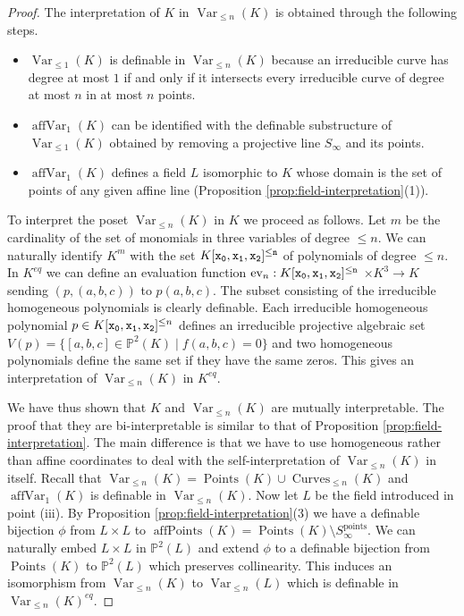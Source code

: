 \documentclass{amsart}
\theoremstyle{plain}
\theoremstyle{definition}
\newcommand{\ev}{\textnormal{ev}}
\newcommand{\nVar}[2]{\operatorname{Var}_{#2} (#1)}
\newcommand{\Points}[1]{\operatorname{Points} (#1)}
\newcommand{\nCurves}[2]{\operatorname{Curves}_{#2}(#1)}
\newcommand{\affPoints}[1]{\operatorname{affPoints} (#1)}
\newcommand{\naffVar}[2]{\operatorname{affVar}_{#2}(#1)}
\begin{document}
\begin{proof}
The interpretation of $K$ in  $\nVar K {\leq n}$ is obtained through the following steps. 
\begin{itemize}
\item[(i)] $\nVar K {\leq 1}$  is definable in $\nVar{K}{\leq n}$ because an irreducible curve has degree at most $1$ if and only if it intersects every irreducible curve of degree at most $n$ in at most $n$ points. 
\item[(ii)] $\naffVar K 1$ can be identified with the definable substructure of $\nVar K {\leq 1}$ obtained by removing a projective line $S_\infty$ and its points. 
\item[(iii)] $\naffVar K 1$ defines a field $L$ isomorphic to $K$  whose domain is the set of points of any given affine line (Proposition \ref{prop:field-interpretation}(1)).
\end{itemize}

To interpret the poset $\nVar K {\leq n}$ in $K$ we proceed as follows. Let $m$ be the cardinality of the set of monomials in three variables of degree $\leq n$. We can naturally identify $K^m$ with the set $K[\tt{x_0, x_1, x_2}]^{\leq n}$ of polynomials of degree $\leq n$. 
In $K^{eq}$ we can define an evaluation function $\ev_n: K[\tt{x_0, x_1, x_2}]^{\leq n}$ $\times K^{3}\to K$ sending $(p, (a,b,c))$ to $p(a,b,c)$. The subset consisting of the irreducible homogeneous polynomials is clearly definable. Each irreducible  homogeneous polynomial $p\in K[{\tt x_0, x_1, x_2}]^{\leq n}$ defines an irreducible projective algebraic set $V(p) = \{[a,b,c]\in \mathbb P^2(K)  \mid f(a,b,c) = 0\}$ and two homogeneous polynomials define the same set if they have the same zeros. This gives an interpretation of $\nVar K {\leq n}$ in $K^{eq}$. 


We have thus shown that $K$ and $\nVar K {\leq n}$ are mutually interpretable. The proof that they are bi-interpretable is similar to that of Proposition \ref{prop:field-interpretation}. The main difference is that we have to use homogeneous rather than affine coordinates to deal with the self-interpretation of $\nVar K {\leq n}$ in itself. Recall that 
$\nVar K {\leq n} = \Points K \cup \nCurves K {\leq n}$ and $\naffVar K 1$ is definable in $\nVar K {\leq n}$.  Now let $L$ be the field introduced in point (iii). By Proposition \ref{prop:field-interpretation}(3) we have a definable bijection $\phi$ from $L\times L$ to $\affPoints K = \Points K \setminus S_\infty^{\text{points}}$. We can naturally embed $L\times L$ in $\mathbb P^2 (L)$ and extend $\phi$ to a definable bijection from $\Points K$ to $\mathbb P^2(L)$ which preserves collinearity. 
This induces an isomorphism from $\nVar K {\leq n}$ to $\nVar L {\leq n}$ which is definable in $\nVar K {\leq n}^{eq}$. 
\end{proof}
\end{document}
